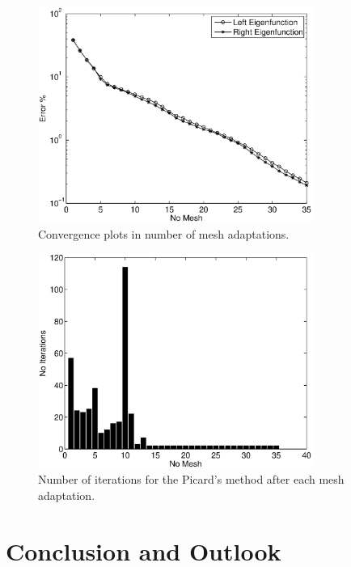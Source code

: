 \documentclass[smallextended]{svjour3}
\begin{document}
\begin{figure}[!ht]
\begin{center}
\includegraphics[width=0.8\textwidth]{mesh.eps}
\end{center}
\caption{Convergence plots in number of mesh adaptations.}
\label{fig:conv2}
\end{figure}

\begin{figure}[!ht]
\begin{center}
\includegraphics[width=0.8\textwidth]{its.eps}
\end{center}
\caption{Number of iterations for the Picard's method after each mesh adaptation.}
\label{fig:its}
\end{figure}






\section{Conclusion and Outlook}\label{sec:conclusion}
 
\end{document}
